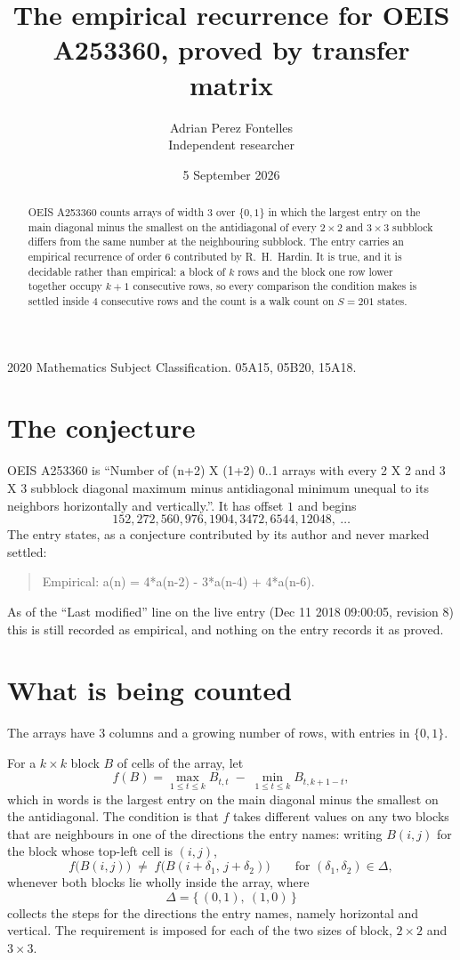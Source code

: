 \documentclass[11pt,a4paper]{article}
\title{The empirical recurrence for OEIS A253360, proved by transfer matrix}
\author{Adrian Perez Fontelles\\ \small Independent researcher}
\date{5 September 2026}
\theoremstyle{plain}
\theoremstyle{definition}
\begin{document}
\maketitle

\begin{abstract}
OEIS A253360 counts arrays of width $3$ over $\{0,1\}$ in which the largest entry on the main diagonal minus the smallest on the antidiagonal of every $2\times2$ and $3\times3$ subblock differs from the same number at the neighbouring subblock. The entry carries an
empirical recurrence of order $6$ contributed by R.~H.~Hardin. It is true, and it is
decidable rather than empirical: a block of $k$ rows and the block one row lower together
occupy $k+1$ consecutive rows, so every comparison the condition makes is settled inside
$4$ consecutive rows and the count is a walk count on $S=201$ states.
\end{abstract}

\noindent\small 2020 Mathematics Subject Classification. 05A15, 05B20, 15A18.\normalsize

\section{The conjecture}

OEIS A253360 is ``Number of (n+2) X (1+2) 0..1 arrays with every 2 X 2 and 3 X 3 subblock diagonal maximum minus antidiagonal minimum unequal to its neighbors horizontally and vertically.''. It has offset $1$ and begins
\[
152, 272, 560, 976, 1904, 3472, 6544, 12048,\ \dots
\]
The entry states, as a conjecture contributed by its author and never marked settled:
\begin{quote}
Empirical: a(n) = 4*a(n-2) - 3*a(n-4) + 4*a(n-6).
\end{quote}
As of the ``Last modified'' line on the live entry (Dec 11 2018 09:00:05, revision 8) this is still
recorded as empirical, and nothing on the entry records it as proved.

\section{What is being counted}

The arrays have $3$ columns and a growing number of rows, with entries in $\{0,1\}$.

For a $k\times k$ block $B$ of cells of the array, let
\[
f(B)=\max_{1\le t\le k}B_{t,t}\;-\;\min_{1\le t\le k}B_{t,k+1-t} ,
\]
which in words is the largest entry on the main diagonal minus the smallest on the antidiagonal. The condition is that $f$ takes different values on any two blocks that
are neighbours in one of the directions the entry names: writing $B(i,j)$ for the block whose
top-left cell is $(i,j)$,
\[
f\bigl(B(i,j)\bigr)\;\neq\;f\bigl(B(i+\delta_1,\,j+\delta_2)\bigr)
\qquad\text{for }(\delta_1,\delta_2)\in\Delta,
\]
whenever both blocks lie wholly inside the array, where
\[
\Delta=\{\,(0,1),\ (1,0)\,\}
\]
collects the steps for the directions the entry names, namely horizontal and vertical. The
requirement is imposed for each of the two sizes of block, $2\times2$ and $3\times3$.
\end{document}
